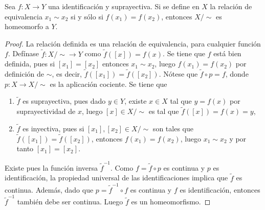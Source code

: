 
\begin{proposition}
Sea $f : X \longrightarrow Y$ una identificación y suprayectiva. Si se define en $X$ la relación de equivalencia $x_1 \sim x_2$ si y sólo si $f(x_1) = f(x_2)$, entonces $X/\sim$ es homeomorfo a $Y$.
\end{proposition}

\begin{proof}
La relación definida es una relación de equivalencia, para cualquier función $f$. Defínase $\widetilde{f} : X/\sim \longrightarrow Y$ como $\widetilde{f}([x]) = f(x)$. Se tiene que $f$ está bien definida, pues si $[x_1] = [x_2]$ entonces $x_1 \sim x_2$, luego $f(x_1) = f(x_2)$ por definición de $\sim$, es decir, $\widetilde{f}([x_1]) = \widetilde{f}([x_2])$. Nótese que $\widetilde{f} \circ p = f$, donde $p : X \longrightarrow X/\sim$ es la aplicación cociente. Se tiene que
\begin{enumerate}[label=\textnormal{(\roman*)}]
\item $\widetilde{f}$ es suprayectiva, pues dado $y \in Y$, existe $x \in X$ tal que $y = f(x)$ por suprayectividad de $x$, luego $[x] \in X/\sim$ es tal que $\widetilde{f}([x]) = f(x) = y$,
\item $\widetilde{f}$ es inyectiva, pues si $[x_1], [x_2] \in X/\sim$ son tales que $\widetilde{f}([x_1]) = \widetilde{f}([x_2])$, entonces $f(x_1) = f(x_2)$, luego $x_1 \sim x_2$ y por tanto $[x_1] = [x_2]$.
\end{enumerate}

Existe pues la función inversa $\widetilde{f}^{-1}$. Como $f = \widetilde{f} \circ p$ es continua y $p$ es identificación, la propiedad universal de las identificaciones implica que $\widetilde{f}$ es continua. Además, dado que $p = \widetilde{f}^{-1} \circ  f$ es continua y $f$ es identificación, entonces $\widetilde{f}^{-1}$ también debe ser continua. Luego $\widetilde{f}$ es un homeomorfismo.
\end{proof}
